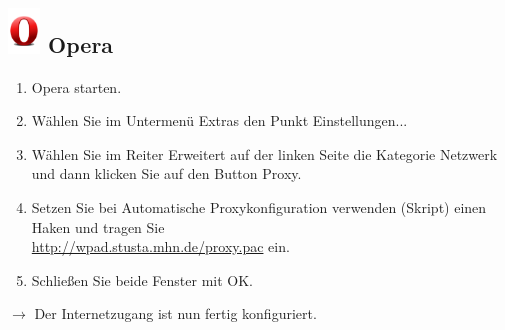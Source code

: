 \documentclass[a4paper,12pt,draft]{scrartcl}
\begin{document}
\subsection*{\includegraphics[height=1.2cm,keepaspectratio]{Bilder/Opera_O} Opera}
\begin{enumerate}
    \item Opera starten.
    \item Wählen Sie im Untermenü Extras den Punkt Einstellungen...
    \item Wählen Sie im Reiter Erweitert auf der linken Seite die Kategorie Netzwerk und dann klicken Sie auf den Button Proxy.
    \item Setzen Sie bei Automatische Proxykonfiguration verwenden (Skript) einen Haken und tragen Sie \\ \url{http://wpad.stusta.mhn.de/proxy.pac} ein.
    \item Schließen Sie beide Fenster mit OK.
\end{enumerate}
$\rightarrow$ Der Internetzugang ist nun fertig konfiguriert.
\end{document}
